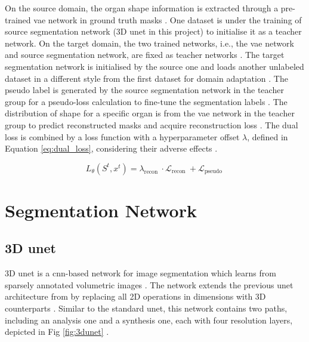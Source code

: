 \documentclass[11pt,times,oneside,openright]{eeereport}
\begin{document}
On the source domain, the organ shape information is extracted through a pre-trained \acrshort{vae} network in ground truth masks \cite{yao2022unsupervised}. One dataset is under the training of source segmentation network (3D \acrshort{unet} in this project) to initialise it as a teacher network. On the target domain, the two trained networks, i.e., the \acrshort{vae} network and source segmentation network, are fixed as teacher networks \cite{yao2022unsupervised}. The target segmentation network is initialised by the source one and loads another unlabeled dataset in a different style from the first dataset for domain adaptation \cite{yao2022unsupervised}. The pseudo label is generated by the source segmentation network in the teacher group for a pseudo-loss calculation to fine-tune the segmentation labels \cite{yao2022unsupervised}. The distribution of shape for a specific organ is from the \acrshort{vae} network in the teacher group to predict reconstructed masks and acquire reconstruction loss \cite{yao2022unsupervised}. The dual loss is combined by a loss function with a hyperparameter offset \(\lambda\), defined in Equation \ref{eq:dual_loss}, considering their adverse effects \cite{yao2022unsupervised}.

\begin{equation} \label{eq:dual_loss}
    L_{\theta}\left(S^{t}, x^{t}\right)=\lambda_{\text {recon }} \cdot \mathcal{L}_{\text {recon }}+\mathcal{L}_{\text {pseudo }}
\end{equation}

\section{Segmentation Network}

\subsection{3D \acrshort{unet}}

3D \acrshort{unet} is a \acrshort{cnn}-based network for image segmentation which learns from sparsely annotated volumetric images \cite{cciccek20163d}. The network extends the previous \acrshort{unet} architecture from \citet{ronneberger2015u} by replacing all 2D operations in dimensions with 3D counterparts \cite{cciccek20163d}. Similar to the standard \acrshort{unet}, this network contains two paths, including an analysis one and a synthesis one, each with four resolution layers, depicted in Fig \ref{fig:3dunet} \cite{cciccek20163d}.
\end{document}

